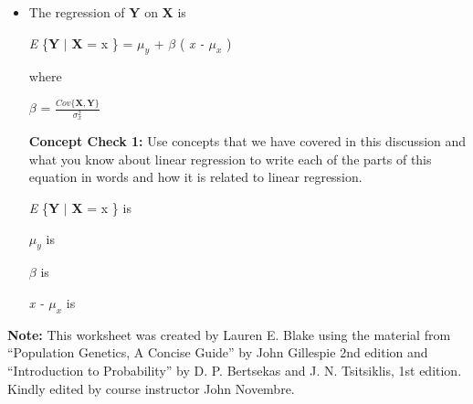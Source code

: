 \documentclass[12pt]{report}
\begin{document}
\begin{itemize}
\newpage
\item The regression of \textbf{Y} on \textbf{X} is 


 \textit{E} \{\textbf{Y} $\mid$ \textbf{X} = x \} = $\mu_{y}$ + $\beta$ \big( \textit{x - $\mu_{x}$} \big)
 
\bigskip
where 

$\beta$ =  $\frac{Cov \{ \textbf{X},\textbf{Y} \} }{ \sigma_{x}^{2}} $

\bigskip
\textbf{Concept Check 1:} Use concepts that we have covered in this discussion and what you know about linear regression to write each of the parts of this equation in words and how it is related to linear regression. 

\bigskip  

\textit{E} \{\textbf{Y} $\mid$ \textbf{X} = x \} is 

\bigskip

\bigskip

\bigskip

$\mu_{y}$ is

\bigskip

\bigskip

\bigskip

$\beta$ is

\bigskip

\bigskip

\bigskip

 \textit{x - $\mu_{x}$} is
 
 \bigskip

\bigskip

\bigskip
 


\end{itemize}


 \bigskip

\bigskip

\bigskip

\textbf{Note:} This worksheet was created by Lauren E. Blake using the material from ``Population Genetics, A Concise Guide'' by John Gillespie 2nd edition and ``Introduction to Probability'' by D. P. Bertsekas and J. N. Tsitsiklis, 1st edition. Kindly edited by course instructor John Novembre. 
\end{document}
